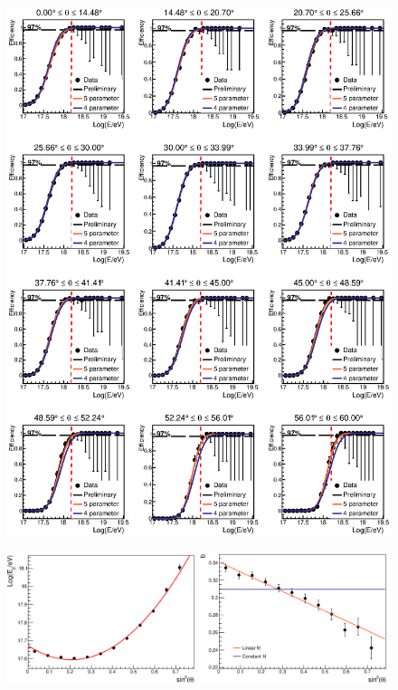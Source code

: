 \documentclass[12pt,a4paper]{article}
\begin{document}
\begin{figure}[p]
\begin{center}
\includegraphics[width=\textwidth]{plots/EfficiencyZenithNew.eps}
\caption{
\label{fig:zenithNew}}
\end{center}
\end{figure}

\begin{figure}[h]
\begin{center}
\includegraphics[width=0.49\textwidth]{plots/E0New.eps}
\includegraphics[width=0.49\textwidth]{plots/bNew.eps}
\caption{
\label{fig:parametersNew}}
\end{center}
\end{figure} 
\end{document}
